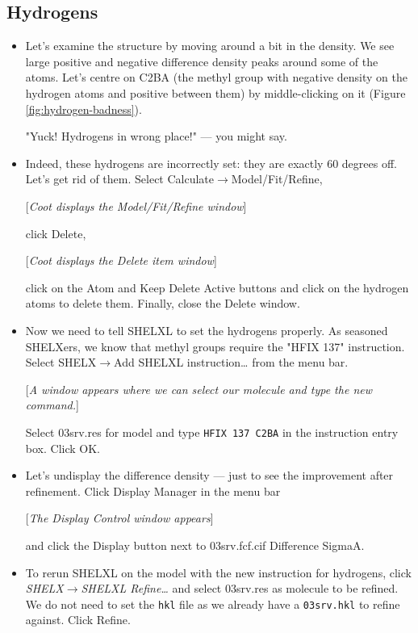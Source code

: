 \documentclass{article}
\begin{document}
\subsection{Hydrogens}
\begin{itemize}
\item Let's examine the structure by moving around a bit in the density. We see large positive and negative difference density peaks around some of the atoms. Let's centre on C2BA (the methyl group with negative density on the hydrogen atoms and positive between them) by middle-clicking on it (Figure \ref{fig:hydrogen-badness}).

"Yuck! Hydrogens in wrong place!" --- you might say.

\item Indeed, these hydrogens are incorrectly set: they are exactly 60 degrees off. Let's get rid of them. Select \textsf{Calculate$\to$Model/Fit/Refine},

[\textsl{Coot displays the Model/Fit/Refine window}]

click \textsf{Delete}, 

[\textsl{Coot displays the Delete item window}]

click on the \textsf{Atom} and \textsf{Keep Delete Active} buttons and click on the hydrogen atoms to delete them. Finally, close the \textsf{Delete} window.

\item Now we need to tell SHELXL to set the hydrogens properly. As seasoned SHELXers, we know that methyl groups require the "HFIX 137" instruction. Select \textsf{SHELX$\to$Add SHELXL instruction\ldots} from the menu bar.

[\textsl{A window appears where we can select our molecule and type the new command.}]

Select 03srv.res for model and type \texttt{HFIX 137 C2BA} in the instruction entry box. Click \textsf{OK}.

\item Let's undisplay the difference density --- just to see the improvement after refinement. Click \textsf{Display Manager} in the menu bar

[\textsl{The Display Control window appears}]

and click the \textsf{Display} button next to \textsf{03srv.fcf.cif Difference SigmaA}.

\item To rerun SHELXL on the model with the new instruction for hydrogens, click \textsl{SHELX$\to$SHELXL Refine\ldots} and select 03srv.res as molecule to be refined. We do not need to set the \texttt{hkl} file as we already have a \texttt{03srv.hkl} to refine against. Click \textsf{Refine}.


\end{itemize}
\end{document}

